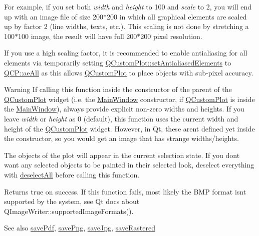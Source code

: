 For example, if you set both {\itshape width} and {\itshape height} to 100 and {\itshape scale} to 2, you will end up with an image file of size 200$\ast$200 in which all graphical elements are scaled up by factor 2 (line widths, texts, etc.). This scaling is not done by stretching a 100$\ast$100 image, the result will have full 200$\ast$200 pixel resolution.

If you use a high scaling factor, it is recommended to enable antialiasing for all elements via temporarily setting \mbox{\hyperlink{class_q_custom_plot_af6f91e5eab1be85f67c556e98c3745e8}{Q\+Custom\+Plot\+::set\+Antialiased\+Elements}} to \mbox{\hyperlink{namespace_q_c_p_ae55dbe315d41fe80f29ba88100843a0caa897c232a0ffc8368e7c100ffc59ef31}{Q\+C\+P\+::ae\+All}} as this allows \mbox{\hyperlink{class_q_custom_plot}{Q\+Custom\+Plot}} to place objects with sub-\/pixel accuracy.

\begin{DoxyWarning}{Warning}
If calling this function inside the constructor of the parent of the \mbox{\hyperlink{class_q_custom_plot}{Q\+Custom\+Plot}} widget (i.\+e. the \mbox{\hyperlink{class_main_window}{Main\+Window}} constructor, if \mbox{\hyperlink{class_q_custom_plot}{Q\+Custom\+Plot}} is inside the \mbox{\hyperlink{class_main_window}{Main\+Window}}), always provide explicit non-\/zero widths and heights. If you leave {\itshape width} or {\itshape height} as 0 (default), this function uses the current width and height of the \mbox{\hyperlink{class_q_custom_plot}{Q\+Custom\+Plot}} widget. However, in Qt, these aren\textquotesingle{}t defined yet inside the constructor, so you would get an image that has strange widths/heights.
\end{DoxyWarning}
The objects of the plot will appear in the current selection state. If you don\textquotesingle{}t want any selected objects to be painted in their selected look, deselect everything with \mbox{\hyperlink{class_q_custom_plot_a9d4808ab925b003054085246c92a257c}{deselect\+All}} before calling this function.

Returns true on success. If this function fails, most likely the B\+MP format isn\textquotesingle{}t supported by the system, see Qt docs about Q\+Image\+Writer\+::supported\+Image\+Formats().

\begin{DoxySeeAlso}{See also}
\mbox{\hyperlink{class_q_custom_plot_a632da44c6d94ea8b271eb483b08b5114}{save\+Pdf}}, \mbox{\hyperlink{class_q_custom_plot_a7636261aff1f6d25c9da749ece3fc8b8}{save\+Png}}, \mbox{\hyperlink{class_q_custom_plot_a490c722092d1771e8ce4a7a73dfd84ab}{save\+Jpg}}, \mbox{\hyperlink{class_q_custom_plot_ab528b84cf92baabe29b1d0ef2f77c93e}{save\+Rastered}} 
\end{DoxySeeAlso}
\mbox{\label{class_q_custom_plot_a490c722092d1771e8ce4a7a73dfd84ab}} 

